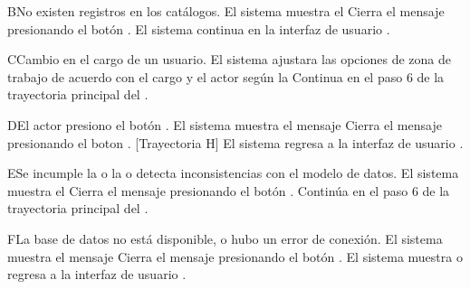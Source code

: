 \begin{UCtrayectoriaA}{B}{No existen registros en los catálogos.}
	\UCpaso     El sistema muestra el 
	\UCpaso[\UCactor] Cierra el mensaje presionando el botón .
	\UCpaso El sistema continua en la interfaz de usuario .
\end{UCtrayectoriaA}

\begin{UCtrayectoriaA}{C}{Cambio en el cargo de un usuario.}
	\UCpaso     El sistema ajustara las opciones de zona de trabajo de acuerdo con el cargo y el actor según la 
	\UCpaso     Continua en el paso 6 de la trayectoria principal del .
\end{UCtrayectoriaA}


\begin{UCtrayectoriaA}{D}{El actor presiono el botón .}
	\UCpaso El sistema muestra el mensaje 
	\UCpaso[\UCactor] Cierra el mensaje presionando el boton  . [Trayectoria H]
	\UCpaso El sistema regresa a la interfaz de usuario .
\end{UCtrayectoriaA}

\begin{UCtrayectoriaA}{E}{Se incumple la  o la   o detecta inconsistencias con el modelo de datos.}
	\UCpaso El sistema muestra el 
	\UCpaso[\UCactor] Cierra el mensaje presionando el botón .
	\UCpaso Continúa en el paso 6 de la trayectoria principal del .
\end{UCtrayectoriaA}


\begin{UCtrayectoriaA}{F}{La base de datos no está disponible, o hubo un error de conexión.}
	\UCpaso El sistema muestra el mensaje 
	\UCpaso[\UCactor] Cierra el mensaje presionando el botón .
	\UCpaso El sistema muestra o regresa a la interfaz de usuario  .
\end{UCtrayectoriaA}


